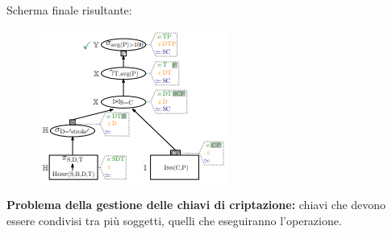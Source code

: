 \documentclass{report}
\begin{document}
\noindent Scherma finale risultante:
\begin{figure}[H]
    \centering
    \includegraphics[width=0.4\linewidth]{images/min2.png}
\end{figure}

 \noindent \textbf{Problema della gestione delle chiavi di criptazione:} chiavi che devono essere condivisi tra più soggetti, quelli che eseguiranno 
l'operazione. 
\end{document}
